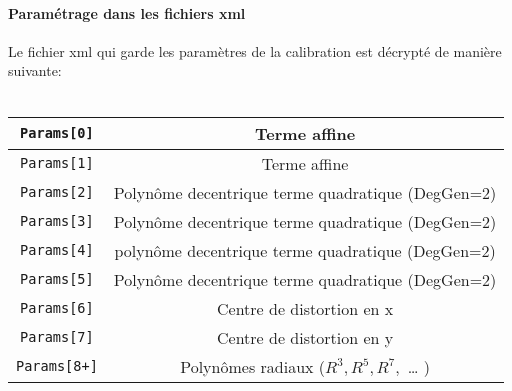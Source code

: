 \documentclass[11pt,a4paper,oneside]{book}
\begin{document}
\paragraph{Paramétrage dans les fichiers xml}
%
Le fichier xml qui garde les paramètres de la calibration est décrypté de manière suivante:\\
\\
%
\begin{tabular} { | c | c | }  
 \hline \hline
{\tt Params[0]} &   Terme affine \\ \hline
{\tt Params[1]} & Terme affine \\ \hline
{\tt Params[2]} &  Polynôme decentrique terme quadratique (DegGen=2) \\ \hline
{\tt Params[3]} &  Polynôme decentrique terme quadratique (DegGen=2) \\ \hline
{\tt Params[4]} &   polynôme decentrique terme quadratique (DegGen=2) \\ \hline
{\tt Params[5]} &  Polynôme decentrique terme quadratique (DegGen=2) \\ \hline
{\tt Params[6]} &  Centre de distortion en x \\ \hline
{\tt Params[7]} &   Centre de distortion en y \\ \hline
{\tt Params[8+]} &   Polynômes radiaux ($R^3, R^5, R^7,$ … ) \\ \hline \hline
  

\end{tabular}\label{tab:XML_fourXX}
%
\end{document}
